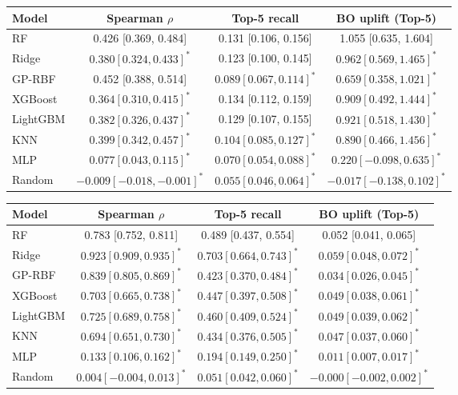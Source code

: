 \begin{tabular}{lccc}
\toprule
Model & Spearman $\rho$ & Top-5 recall & BO uplift (Top-5) \\
\midrule
RF & 0.426 [0.369, 0.484] & 0.131 [0.106, 0.156] & 1.055 [0.635, 1.604] \\
Ridge & $0.380 [0.324, 0.433]^{*}$ & 0.123 [0.100, 0.145] & $0.962 [0.569, 1.465]^{*}$ \\
GP-RBF & 0.452 [0.388, 0.514] & $0.089 [0.067, 0.114]^{*}$ & $0.659 [0.358, 1.021]^{*}$ \\
XGBoost & $0.364 [0.310, 0.415]^{*}$ & 0.134 [0.112, 0.159] & $0.909 [0.492, 1.444]^{*}$ \\
LightGBM & $0.382 [0.326, 0.437]^{*}$ & 0.129 [0.107, 0.155] & $0.921 [0.518, 1.430]^{*}$ \\
KNN & $0.399 [0.342, 0.457]^{*}$ & $0.104 [0.085, 0.127]^{*}$ & $0.890 [0.466, 1.456]^{*}$ \\
MLP & $0.077 [0.043, 0.115]^{*}$ & $0.070 [0.054, 0.088]^{*}$ & $0.220 [-0.098, 0.635]^{*}$ \\
Random & $-0.009 [-0.018, -0.001]^{*}$ & $0.055 [0.046, 0.064]^{*}$ & $-0.017 [-0.138, 0.102]^{*}$ \\
\bottomrule
\end{tabular}

\begin{tabular}{lccc}
\toprule
Model & Spearman $\rho$ & Top-5 recall & BO uplift (Top-5) \\
\midrule
RF & 0.783 [0.752, 0.811] & 0.489 [0.437, 0.554] & 0.052 [0.041, 0.065] \\
Ridge & $0.923 [0.909, 0.935]^{*}$ & $0.703 [0.664, 0.743]^{*}$ & $0.059 [0.048, 0.072]^{*}$ \\
GP-RBF & $0.839 [0.805, 0.869]^{*}$ & $0.423 [0.370, 0.484]^{*}$ & $0.034 [0.026, 0.045]^{*}$ \\
XGBoost & $0.703 [0.665, 0.738]^{*}$ & $0.447 [0.397, 0.508]^{*}$ & $0.049 [0.038, 0.061]^{*}$ \\
LightGBM & $0.725 [0.689, 0.758]^{*}$ & $0.460 [0.409, 0.524]^{*}$ & $0.049 [0.039, 0.062]^{*}$ \\
KNN & $0.694 [0.651, 0.730]^{*}$ & $0.434 [0.376, 0.505]^{*}$ & $0.047 [0.037, 0.060]^{*}$ \\
MLP & $0.133 [0.106, 0.162]^{*}$ & $0.194 [0.149, 0.250]^{*}$ & $0.011 [0.007, 0.017]^{*}$ \\
Random & $0.004 [-0.004, 0.013]^{*}$ & $0.051 [0.042, 0.060]^{*}$ & $-0.000 [-0.002, 0.002]^{*}$ \\
\bottomrule
\end{tabular}
